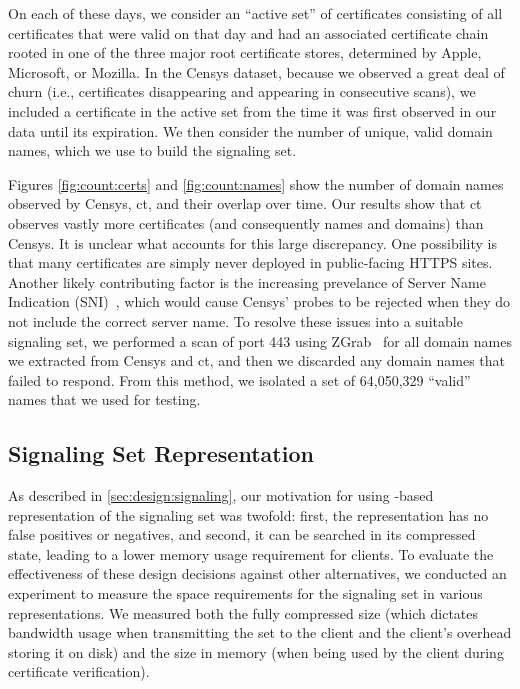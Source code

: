 On each of these days, we consider an ``active set'' of certificates consisting
of all certificates that were valid on that day and had an associated
certificate chain rooted in one of the three major root certificate stores,
determined by Apple, Microsoft, or Mozilla. In the Censys dataset, because we
observed a great deal of churn (i.e., certificates disappearing and appearing in
consecutive scans), we included a certificate in the active set from the
time it was first observed in our data until its expiration. We then consider
the number of unique, valid domain names, which we use to build the signaling
set.

Figures \autoref{fig:count:certs} and \autoref{fig:count:names} show the number of
domain names observed by Censys, \ac{ct}, and their overlap over time. Our results show 
that \ac{ct} observes vastly more certificates 
(and consequently names and domains) 
than Censys. 
It is unclear what accounts for this large discrepancy.
One possibility is that many certificates are simply never
deployed in public-facing HTTPS sites.
Another likely contributing factor is the increasing prevelance of 
Server Name Indication (SNI)~\cite{rfc6066}, which would cause Censys' probes to be rejected
when they do not include the correct server name.
To resolve these issues into a suitable signaling set, we performed a scan of
port 443 using ZGrab~\cite{durumeric2015search} for all domain names we
extracted from Censys and \ac{ct}, and then we discarded any domain names that
failed to respond. From this method, we isolated a set of 64,050,329 ``valid''
names that we used for testing.

\subsection{Signaling Set Representation}
\label{sec:evaluation:implementation}

As described in \autoref{sec:design:signaling}, our motivation for using -based
representation of the signaling set was twofold: first, the representation has
no false positives or negatives, and second, it can be searched in its
compressed state, leading to a lower memory usage requirement for clients. To
evaluate the effectiveness of these design decisions against other alternatives,
we conducted an experiment to measure the space requirements for the signaling
set in various representations. 
We measured both the fully compressed size 
(which dictates bandwidth usage when transmitting
the set to the client and the client's overhead storing it on disk)
and the size in memory (when being used by the client during certificate verification).

